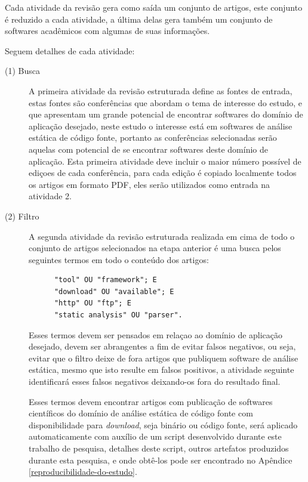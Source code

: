 Cada atividade da revisão gera como saída um conjunto de artigos, este conjunto
é reduzido a cada atividade, a última delas gera também um conjunto de
softwares acadêmicos com algumas de suas informações.

Seguem detalhes de cada atividade:

\begin{description}

  \item[(1) Busca]
    A primeira atividade da revisão estruturada define as fontes de entrada,
    estas fontes são conferências que abordam o tema de interesse do estudo, e
    que apresentam um grande potencial de encontrar softwares do domínio de
    aplicação desejado, neste estudo o interesse está em softwares de análise
    estática de código fonte, portanto as conferências selecionadas serão
    aquelas com potencial de se encontrar softwares deste domínio de aplicação.
    Esta primeira atividade deve incluir o maior número possível de ediçoes de
    cada conferência, para cada edição é copiado localmente todos os artigos em
    formato PDF, eles serão utilizados como entrada na atividade 2.

  \item[(2) Filtro]
    A segunda atividade da revisão estruturada realizada em cima de todo o
    conjunto de artigos selecionados na etapa anterior é uma busca pelos
    seguintes termos em todo o conteúdo dos artigos:

    \begin{verbatim}
      "tool" OU "framework"; E
      "download" OU "available"; E
      "http" OU "ftp"; E
      "static analysis" OU "parser".
    \end{verbatim}

    Esses termos devem ser pensados em relaçao ao domínio de aplicação
    desejado, devem ser abrangentes a fim de evitar falsos negativos, ou seja,
    evitar que o filtro deixe de fora artigos que publiquem software de análise
    estática, mesmo que isto resulte em falsos positivos, a atividade seguinte
    identificará esses falsos negativos deixando-os fora do resultado final.

    Esses termos devem encontrar artigos com publicação de softwares
    científicos do domínio de análise estática de código fonte com
    disponibilidade para {\it download}, seja binário ou código fonte, será
    aplicado automaticamente com auxílio de um script desenvolvido durante este
    trabalho de pesquisa, detalhes deste script, outros artefatos produzidos
    durante esta pesquisa, e onde obtê-los pode ser encontrado no Apêndice
    \ref{reproducibilidade-do-estudo}.


\end{description}
